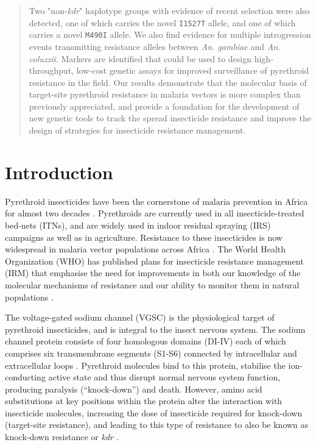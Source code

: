 \documentclass[a4paper,11pt,abstracton,hidelinks]{scrartcl}
\begin{document}
\begin{abstract}
%
Two "non-\textit{kdr}" haplotype groups with evidence of recent selection were also detected, one of which carries the novel \texttt{I1527T} allele, and one of which carries a novel \texttt{M490I} allele.
%
We also find evidence for multiple introgression events transmitting resistance alleles between \textit{An. gambiae} and \textit{An. coluzzii}.
%
Markers are identified that could be used to design high-throughput, low-cost genetic assays for improved surveillance of pyrethroid resistance in the field.
%
Our results demonstrate that the molecular basis of target-site pyrethroid resistance in malaria vectors is more complex than previously appreciated, and provide a foundation for the development of new genetic tools to track the spread insecticide resistance and improve the design of strategies for insecticide resistance management.

\end{abstract}


\section*{Introduction}


Pyrethroid insecticides have been the cornerstone of malaria prevention in Africa for almost two decades \cite{Bhatt2015}.
%
Pyrethroids are currently used in all insecticide-treated bed-nets (ITNs), and are widely used in indoor residual spraying (IRS) campaigns as well as in agriculture.
%
Resistance to these insecticides is now widespread in malaria vector populations across Africa \cite{Hemingway2016}.
%
The World Health Organization (WHO) has published plans for insecticide resistance management (IRM) that emphasise the need for improvements in both our knowledge of the molecular mechanisms of resistance and our ability to monitor them in natural populations \cite{WorldHealthOrganization2012,world2017global}.


The voltage-gated sodium channel (VGSC) is the physiological target of pyrethroid insecticides, and is integral to the insect nervous system.
%
The sodium channel protein consists of four homologous domains (DI-IV) each of which comprises six transmembrane segments (S1-S6) connected by intracellular and extracellular loops \cite{Dong2014}.
%
Pyrethroid molecules bind to this protein, stabilise the ion-conducting active state and thus disrupt normal nervous system function, producing paralysis (``knock-down'') and death.
%
However, amino acid substitutions at key positions within the protein alter the interaction with insecticide molecules, increasing the dose of insecticide required for knock-down (target-site resistance), and leading to this type of resistance to also be known as knock-down resistance or \textit{kdr} \cite{Davies2007a,Dong2014}.
\end{document}
